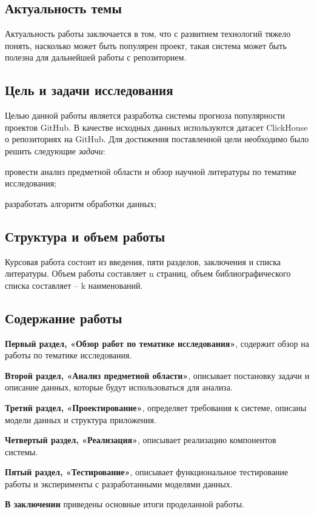     \newpage
{}
\subsection*{Актуальность темы}
Актуальность работы заключается в том, что с развитием технологий тяжело понять, насколько может быть популярен проект, такая система может быть полезна для дальнейшей работы с репозиторием. 

\subsection*{Цель и задачи исследования}
Целью данной работы является разработка системы прогноза популярности проектов GitHub. В качестве исходных данных используются датасет ClickHouse о репозиториях на GitHub. Для достижения поставленной цели необходимо было решить следующие \textit{задачи}:
\begin{enumerateparen}
	\item провести анализ предметной области и обзор научной литературы по тематике исследования;
	\item разработать алгоритм обработки данных;
	\item 
\end{enumerateparen}
\vspace{0.5em}
\subsection*{Структура и объем работы}

Курсовая работа состоит из введения, пяти разделов, заключения и списка литературы. Объем работы составляет n страниц, объем библиографического списка составляет – k наименований.

\subsection*{Содержание работы}

\textbf{Первый раздел, «Обзор работ по тематике исследования»}, содержит обзор на работы по тематике исследования.

\textbf{Второй раздел, «Анализ предметной области»}, описывает постановку задачи и описание данных, которые будут использоваться для анализа.

\textbf{Третий раздел, «Проектирование»}, определяет требования к системе, описаны модели данных и структура приложения.

\textbf{Четвертый раздел, «Реализация»}, описывает реализацию компонентов системы.

\textbf{Пятый раздел, «Тестирование»}, описывает функциональное тестирование работы и эксперименты с разработанными моделями данных.

\textbf{В заключении} приведены основные итоги проделанной работы.